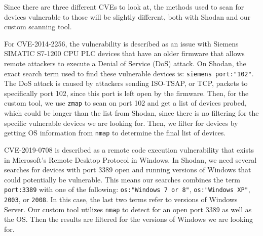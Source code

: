 Since there are three different CVEs to look at, the methods used to scan
for devices vulnerable to those will be slightly different, both with
Shodan and our custom scanning tool.

For CVE-2014-2256, the vulnerability is described as an issue with Siemens
SIMATIC S7-1200 CPU PLC devices that have an older firmware that allows remote
attackers to execute a Denial of Service (DoS) attack\cite{CVE-2014-2256}. On Shodan, the exact
search term used to find these vulnerable devices is: \verb|siemens port:"102"|.
The DoS attack is caused by attackers sending ISO-TSAP, or TCP, packets to
specifically port 102, since this port is left open by the firmware. Then, for
the custom tool, we use \verb|zmap| to scan on port 102 and get a list of devices
probed, which could be longer than the list from Shodan, since there is no
filtering for the specific vulnerable devices we are looking for. Then, we filter
for devices by getting OS information from \verb|nmap| to determine the final
list of devices.

CVE-2019-0708 is described as a remote code execution vulnerability that
exists in Microsoft's Remote Desktop Protocol in Windows\cite{CVE-2019-0708}. In Shodan, we need
several searches for devices with port 3389 open and running versions of 
Windows that could potentially be vulnerable. This means our searches combines
the term \verb|port:3389| with one of the following: \verb|os:"Windows 7 or 8"|,
\verb|os:"Windows XP"|, \verb|2003|, or \verb|2008|. In this case, the last two
terms refer to versions of Windows Server. Our custom tool utilizes \verb|nmap|
to detect for an open port 3389 as well as the OS. Then the results are filtered
for the versions of Windows we are looking for.

